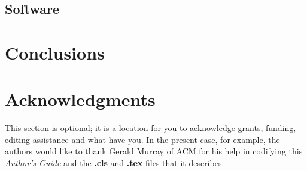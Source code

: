 \documentclass{nime-alternate}
\begin{document}
\subsection{Software}

\section{Conclusions}

\section{Acknowledgments}
This section is optional; it is a location for you
to acknowledge grants, funding, editing assistance and
what have you.  In the present case, for example, the
authors would like to thank Gerald Murray of ACM for
his help in codifying this \textit{Author's Guide}
and the \textbf{.cls} and \textbf{.tex} files that it describes.

%



\end{document}
